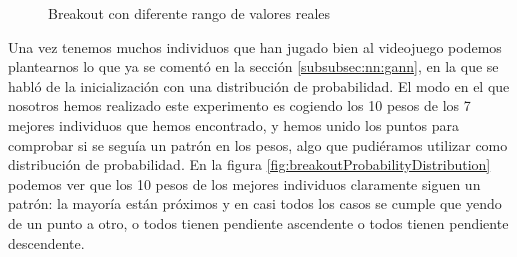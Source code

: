 \begin{figure}[!h]
    \centering
    
    
    \caption{Breakout con diferente rango de valores reales}
    \label{fig:breakoutWeightsFactor2}
\end{figure}

Una vez tenemos muchos individuos que han jugado bien al videojuego podemos plantearnos lo que ya se comentó en la sección \ref{subsubsec:nn:gann}, en la que se habló de la inicialización con una distribución de probabilidad. El modo en el que nosotros hemos realizado este experimento es cogiendo los 10 pesos de los 7 mejores individuos que hemos encontrado, y hemos unido los puntos para comprobar si se seguía un patrón en los pesos, algo que pudiéramos utilizar como distribución de probabilidad. En la figura \ref{fig:breakoutProbabilityDistribution} podemos ver que los 10 pesos de los mejores individuos claramente siguen un patrón: la mayoría están próximos y en casi todos los casos se cumple que yendo de un punto a otro, o todos tienen pendiente ascendente o todos tienen pendiente descendente.

